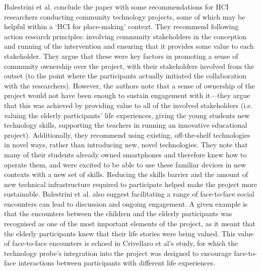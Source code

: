 Balestrini et al. conclude the paper with some recommendations for HCI researchers conducting community technology projects, some of which may be helpful within a `HCI for place-making' context. They recommend following action research principles: involving community stakeholders in the conception and running of the intervention and ensuring that it provides some value to each stakeholder. They argue that these were key factors in promoting a sense of community ownership over the project, with their stakeholders involved from the outset (to the point where the participants actually initiated the collaboration with the researchers). However, the authors note that a sense of ownership of the project would not have been enough to sustain engagement with it---they argue that this was achieved by providing value to all of the involved stakeholders (i.e. valuing the elderly participants' life experiences, giving the young students new technology skills, supporting the teachers in running an innovative educational project). Additionally, they recommend using existing, off-the-shelf technologies in novel ways, rather than introducing new, novel technologies. They note that many of their students already owned smartphones and therefore knew how to operate them, and were excited to be able to use these familiar devices in new contexts with a new set of skills. Reducing the skills barrier and the amount of new technical infrastructure required to participate helped make the project more sustainable. Balestrini et al. also suggest facilitating a range of face-to-face social encounters can lead to discussion and ongoing engagement. A given example is that the encounters between the children and the elderly participants was recognised as one of the most important elements of the project, as it meant that the elderly participants knew that their life stories were being valued. This value of face-to-face encounters is echoed in Crivellaro et al's study, for which the technology probe's integration into the project was designed to encourage face-to-face interactions between participants with different life experiences.

